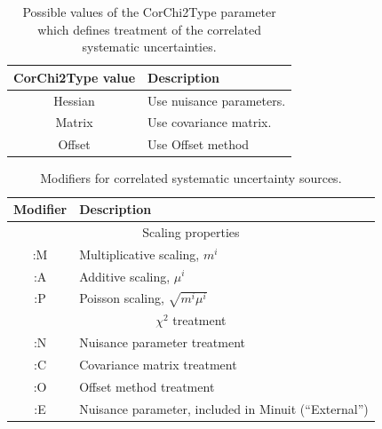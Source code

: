 \begin{table}
\begin{center}
\begin{tabular}{cl}
\hline
    {\sc CorChi2Type} value &  Description \\
\hline
  {\sc Hessian}             & Use nuisance parameters.\\
  {\sc Matrix }             & Use covariance matrix. \\
  {\sc Offset }             & Use Offset method\\
\hline
\end{tabular}
\end{center}
\caption{\label{tab:Chi2Type}Possible values of the {\sc CorChi2Type} parameter which defines treatment of the correlated systematic uncertainties.}
\end{table}
 
\begin{table}
\begin{center}
\begin{tabular}{cl}
\hline
  Modifier &  Description \\
\hline
   \multicolumn{2}{c}{Scaling properties}\\
  {\sc :M}  &  Multiplicative scaling, $ m^i$ \\
  {\sc :A}  &  Additive scaling, $ \mu^i$ \\
  {\sc :P}  &  Poisson scaling, $ \sqrt{m^i\mu^i}$ \\
   \multicolumn{2}{c}{$\chi^2$ treatment}\\
  {\sc :N}  &  Nuisance parameter treatment \\
  {\sc :C}  &  Covariance matrix treatment \\
  {\sc :O}  &  Offset method treatment \\
  {\sc :E}  &  Nuisance parameter, included in {\sc Minuit} (``External'')\\
\hline
\end{tabular}
\end{center}
\caption{\label{tab:SystModifier}Modifiers for correlated systematic
uncertainty sources.}
\end{table}


